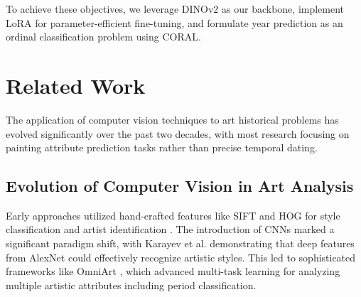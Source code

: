 \documentclass[10pt,twocolumn,letterpaper]{article}
\begin{document}
To achieve these objectives, we leverage DINOv2 as our backbone, implement LoRA for parameter-efficient fine-tuning, and formulate year prediction as an ordinal classification problem using CORAL.




\section{Related Work}

The application of computer vision techniques to art historical problems has evolved significantly over the past two decades, with most research focusing on painting attribute prediction tasks rather than precise temporal dating.

\subsection{Evolution of Computer Vision in Art Analysis}

Early approaches utilized hand-crafted features like SIFT and HOG for style classification and artist identification \cite{Karayev14}. The introduction of CNNs marked a significant paradigm shift, with Karayev et al. demonstrating that deep features from AlexNet could effectively recognize artistic styles. This led to sophisticated frameworks like OmniArt \cite{Strezoski17OmniArt, Strezoski18}, which advanced multi-task learning for analyzing multiple artistic attributes including period classification.
\end{document}
